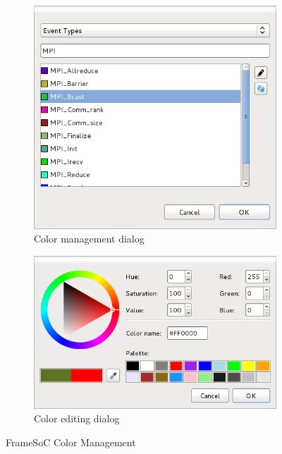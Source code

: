 \documentclass[twoside]{article}
\begin{document}
\begin{sloppypar}
\begin{figure}[h!]
  \centering
  \begin{subfigure}[c]{0.46\textwidth}
    \includegraphics[width=1.0\textwidth]{images/color_type_list_MPI.png}
    \caption{Color management dialog}
    \label{fig:color_type_list_MPI}
  \end{subfigure}%
  \hspace{30pt}
  \begin{subfigure}[c]{0.46\textwidth}
    \includegraphics[width=1.0\textwidth]{images/color_editing.png}
    \caption{Color editing dialog}
    \label{fig:color_editing}       
  \end{subfigure}%
  \caption{FrameSoC Color Management}
  \label{fig:colors}       
 \end{figure}


\end{sloppypar}
\end{document}
